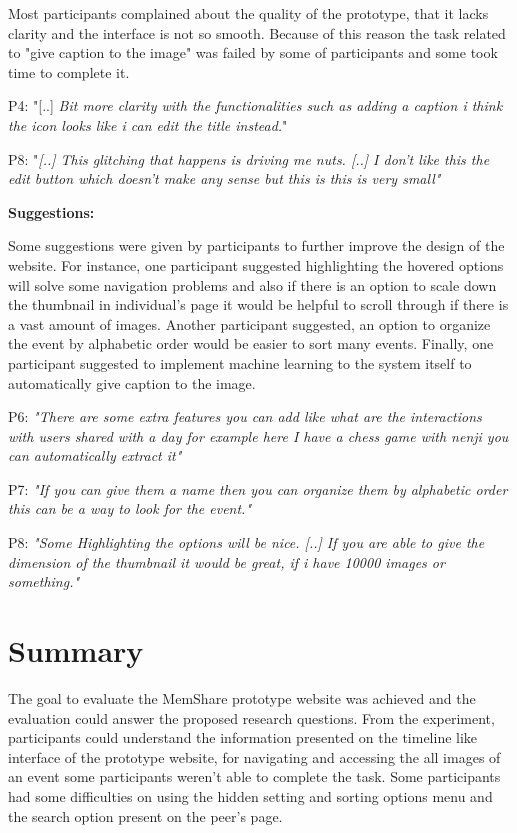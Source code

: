 \documentclass[mscthesis]{usiinfthesis}
\begin{document}
Most participants complained about the quality of the prototype, that it lacks clarity and the interface is not so smooth. Because of this reason the task related to "give caption to the image" was failed by some of participants and some took time to complete it. 
\newline
\begin{adjustwidth}{1cm}{1cm}
\hspace{\parindent}P4: "[..] \textit{Bit more clarity with the functionalities such as adding a caption i think the icon looks like i can edit the title instead.}"

P8: "\textit{[..] This glitching that happens is driving me nuts. [..] I don't like this the edit button which doesn't make any sense but this is this is very small"}
\newline
\newline
\end{adjustwidth}
\textbf{Suggestions:}

Some suggestions were given by participants to further improve the design of the website. For instance, one participant suggested highlighting the hovered options will solve some navigation problems and also if there is an option to scale down the thumbnail in individual's page it would be helpful to scroll through if there is a vast amount of images. Another participant suggested, an option to organize the event by alphabetic order would be easier to sort many events. Finally, one participant suggested to implement machine learning to the system itself to automatically give caption to the image.
\newline
\begin{adjustwidth}{1cm}{1cm}
\hspace{\parindent}P6: \textit{"There are some extra features you can add like what are the interactions with users shared with a day for example here I have a chess game with nenji you can automatically extract it"}

P7: \textit{"If you can give them a name then you can organize them by alphabetic order this can be a way to look for the event."}

P8: \textit{"Some Highlighting the options will be nice. [..] If you are able to give the dimension of the thumbnail it would be great, if i have 10000 images or something."}
\end{adjustwidth}
\section{Summary}  
The goal to evaluate the MemShare prototype website was achieved and the evaluation could answer the proposed research questions. From the experiment, participants could understand the information presented on the timeline like interface of the prototype website, for navigating and accessing the all images of an event some participants weren't able to complete the task. Some participants had some difficulties on using the hidden setting and sorting options menu and the search option present on the peer's page. 
\end{document}
